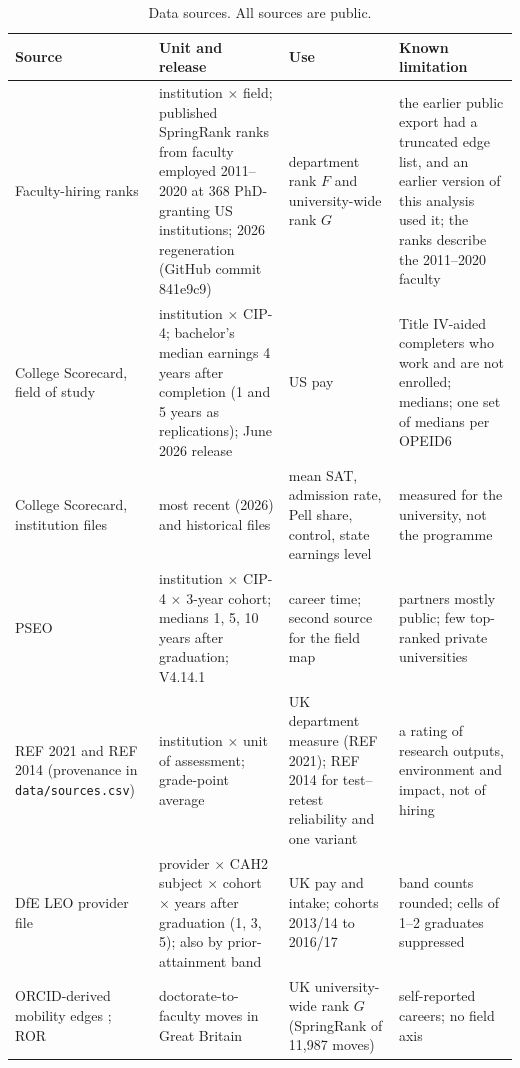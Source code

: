 \documentclass[11pt]{article}
\begin{document}
\begin{table}[!htbp]
\centering
\caption{Data sources. All sources are public.}\label{tab:si-data}
\scriptsize
\renewcommand{\arraystretch}{1.1}
\setlength{\tabcolsep}{3pt}
\begin{tabular}{@{}>{\raggedright\arraybackslash}p{3.0cm}>{\raggedright\arraybackslash}p{3.7cm}>{\raggedright\arraybackslash}p{3.6cm}>{\raggedright\arraybackslash}p{3.9cm}@{}}
\toprule
Source & Unit and release & Use & Known limitation \\
\midrule
Faculty-hiring ranks \citep{wapman2026data, wapman2022quantifying} & institution $\times$ field; published SpringRank ranks from faculty employed 2011--2020 at 368 PhD-granting US institutions; 2026 regeneration (GitHub commit 841e9c9) & department rank $F$ and university-wide rank $G$ & the earlier public export \citep{wapman2022data} had a truncated edge list, and an earlier version of this analysis used it; the ranks describe the 2011--2020 faculty \\
College Scorecard, field of study \citep{scorecard} & institution $\times$ CIP-4; bachelor's median earnings 4 years after completion (1 and 5 years as replications); June 2026 release & US pay & Title IV-aided completers who work and are not enrolled; medians; one set of medians per OPEID6 \\
College Scorecard, institution files \citep{scorecard} & most recent (2026) and historical files & mean SAT, admission rate, Pell share, control, state earnings level & measured for the university, not the programme \\
PSEO \citep{pseo, pseo2026} & institution $\times$ CIP-4 $\times$ 3-year cohort; medians 1, 5, 10 years after graduation; V4.14.1 & career time; second source for the field map & partners mostly public; few top-ranked private universities \\
REF 2021 \citep{ref2021results} and REF 2014 (provenance in \texttt{data/sources.csv}) & institution $\times$ unit of assessment; grade-point average & UK department measure (REF 2021); REF 2014 for test--retest reliability and one variant & a rating of research outputs, environment and impact, not of hiring \\
DfE LEO provider file \citep{dfe_leo_provider} & provider $\times$ CAH2 subject $\times$ cohort $\times$ years after graduation (1, 3, 5); also by prior-attainment band & UK pay and intake; cohorts 2013/14 to 2016/17 & band counts rounded; cells of 1--2 graduates suppressed \\
ORCID-derived mobility edges \citep{li2026orcid}; ROR \citep{ror2026data} & doctorate-to-faculty moves in Great Britain & UK university-wide rank $G$ (SpringRank of 11,987 moves) & self-reported careers; no field axis \\

\end{tabular}
\end{table}
\end{document}

